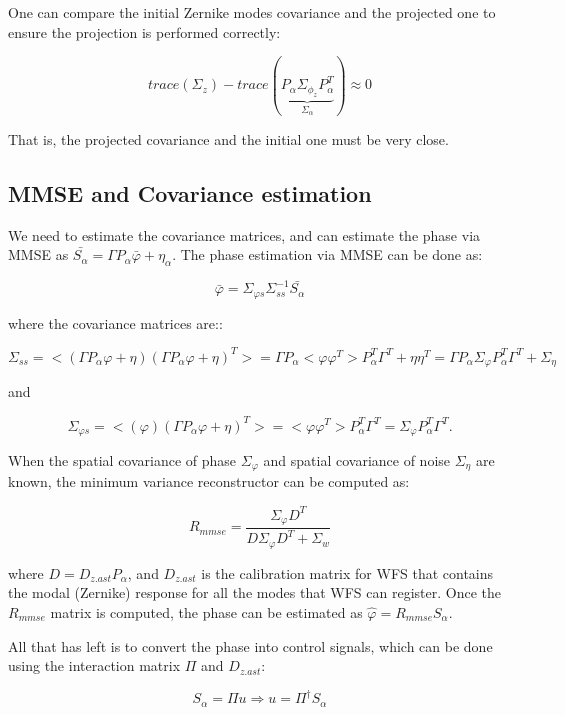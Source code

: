 \documentclass[a4paper,12pt]{article}
\begin{document}
One can compare the initial Zernike modes covariance and the projected one to ensure the projection is performed correctly:

$$trace (\Sigma_z) - trace(\underbrace{P_\alpha \Sigma_{\phi_z}P_\alpha^T}_{\Sigma_\alpha}) \approx 0$$

That is, the projected covariance and the initial one must be very close. 


\subsection{MMSE and Covariance estimation}
We need to estimate the covariance matrices, and can estimate the phase via MMSE as $\bar{S_\alpha} =  \Gamma P_\alpha  \bar{\varphi} + \eta_\alpha $. The phase estimation via MMSE can be done as:

\begin{equation}\label{eq:LMMSEreconstructor}
\bar{\varphi} = \Sigma_{\varphi s}  \Sigma_{s s}^{-1} \bar{S_\alpha} 
\end{equation} 


where the covariance matrices are:: 

$$\Sigma_{s s} = <(\Gamma P_\alpha  \varphi + \eta)(\Gamma P_\alpha   \varphi + \eta)^T> = \Gamma P_\alpha  < \varphi \varphi^T> P_\alpha ^T \Gamma^T + \eta \eta^T  = \Gamma P_\alpha  \Sigma_\varphi   P_\alpha ^T \Gamma^T + \Sigma_\eta $$ 

 and   

$$\Sigma_{\varphi s} = <(\varphi)(\Gamma P_\alpha   \varphi + \eta)^T> = < \varphi \varphi^T> P_\alpha^T \Gamma^T  = \Sigma_\varphi P_\alpha^T \Gamma^T.$$

When the spatial covariance of phase $\Sigma_{\varphi}$ and spatial covariance of noise $\Sigma_\eta$ are known, the minimum variance reconstructor can be computed as:

$$R_{mmse} = \frac{\Sigma_\varphi D^T}{D \Sigma_\varphi D^T  + \Sigma_w}$$

where $D = D_{z.ast} P_\alpha$, and $D_{z.ast}$ is the calibration matrix for WFS that contains the modal (Zernike) response for all the modes that WFS can register. Once the $R_{mmse}$ matrix is computed, the phase can be estimated as $\hat{\varphi} = R_{mmse} S_\alpha$.

All that has left is to convert the phase into control signals, which can be done using the interaction matrix $\Pi$ and $D_{z.ast}$:

$$S_\alpha = \Pi u  \Rightarrow  u = \Pi^\dagger S_\alpha$$
\end{document}
